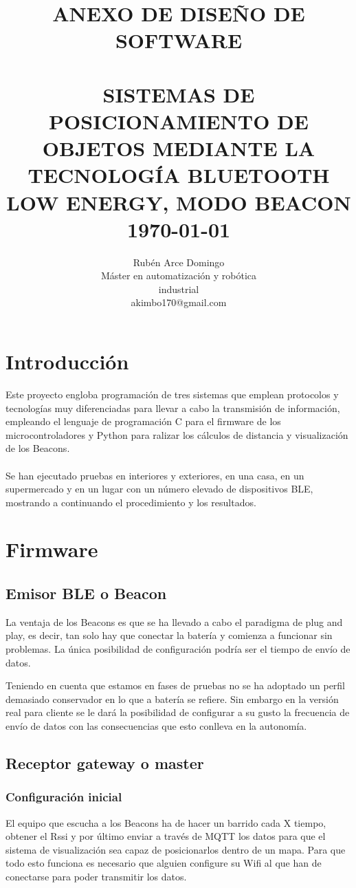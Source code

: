 \documentclass[paper=a4, fontsize=11pt,twoside]{scrartcl}
\title{	\normalsize \textsc{ANEXO DE DISEÑO DE SOFTWARE} 	%
		 	\\[2.0cm]								%
			\HRule{0.5pt} \\						%
			\LARGE \textbf{\uppercase{Sistemas de posicionamiento de objetos mediante la tecnología Bluetooth Low Energy, modo Beacon}}	%
			\HRule{2pt} \\ [0.5cm]		%
			\normalsize \today			%
		}
\author{
		Rubén Arce Domingo\\	
		Máster en automatización y robótica\\	
		industrial\\
		akimbo170@gmail.com\\
}
\makeatletter
\def\printtitle{%
    {\centering \@title\par}}
\def\printauthor{%
    {\centering \large \@author}}
\makeatother
\begin{document}
\thispagestyle{empty}		%
\printtitle					%
  	\vfill
\printauthor				%
\newpage
\cleardoublepage
\tableofcontents
\listoffigures
\cleardoublepage
\pagestyle{fancy}
\section{Introducción}
    Este proyecto engloba programación de tres sistemas que emplean protocolos y tecnologías muy diferenciadas para llevar a cabo 
    la transmisión de información, empleando el lenguaje de programación C para el firmware de los 
    microcontroladores y Python para ralizar los cálculos de distancia y visualización de los Beacons.
    \paragraph{}
    Se han ejecutado pruebas en interiores y exteriores, en una casa, en un supermercado y en un lugar con un número elevado 
    de dispositivos BLE, mostrando a continuando el procedimiento y los resultados.
\section{Firmware}
    \subsection{Emisor BLE o Beacon}
        La ventaja de los Beacons es que se ha llevado a cabo el paradigma de plug and play, es decir, tan solo hay que conectar la batería y comienza 
        a funcionar sin problemas. La única posibilidad de configuración podría ser el tiempo de envío de datos.
        
        Teniendo en cuenta que estamos en fases de pruebas no se ha adoptado un perfil demasiado conservador en lo que a batería se refiere. 
        Sin embargo en la versión real para cliente se le dará la posibilidad de configurar a su gusto la frecuencia de envío de datos con las consecuencias 
        que esto conlleva en la autonomía.
    \subsection{Receptor gateway o master}
        \subsubsection{Configuración inicial}
            El equipo que escucha a los Beacons ha de hacer un barrido cada X tiempo, obtener el Rssi y por último enviar a través de MQTT los datos 
            para que el sistema de visualización sea capaz de posicionarlos dentro de un mapa.
            Para que todo esto funciona es necesario que alguien configure su Wifi al que han de conectarse para poder transmitir los datos.
\end{document}
